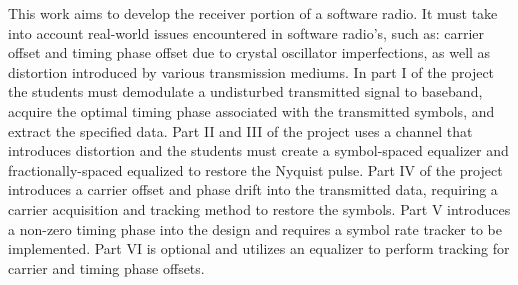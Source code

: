 This work aims to develop the receiver portion of a software radio. It must take into account real-world issues encountered in software radio's, such as: carrier offset and timing phase offset due to crystal oscillator imperfections, as well as distortion introduced by various transmission mediums. In part I of the project the students must demodulate a undisturbed transmitted signal to baseband, acquire the optimal timing phase associated with the transmitted symbols, and extract the specified data. Part II and III of the project uses a channel that introduces distortion and the students must create a symbol-spaced equalizer and fractionally-spaced equalized to restore the Nyquist pulse. Part IV of the project introduces a carrier offset and phase drift into the transmitted data, requiring a carrier acquisition and tracking method to restore the symbols. Part V introduces a non-zero timing phase into the design and requires a symbol rate tracker to be implemented. Part VI is optional and utilizes an equalizer to perform tracking for carrier and timing phase offsets.
